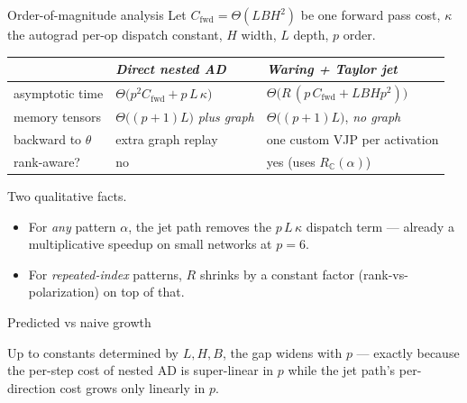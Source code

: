 \documentclass[10pt,aspectratio=169]{beamer}
\newcommand{\C}{\mathbb{C}}
\begin{document}
\begin{frame}{Order-of-magnitude analysis}
  Let $C_{\mathrm{fwd}}\!\!=\!\!\Theta(L B H^2)$ be one forward pass cost,
  $\kappa$ the autograd per-op dispatch constant, $H$ width, $L$ depth, $p$ order.

  \medskip
  \begin{tabular}{lll}
    \toprule
    & \emph{Direct nested AD} & \emph{Waring + Taylor jet} \\
    \midrule
    asymptotic time
    & $\Theta\!\big(p^2 C_{\mathrm{fwd}} + p\, L\, \kappa\big)$
    & $\Theta\!\big(R\,(p\,C_{\mathrm{fwd}} + L B H p^2)\big)$ \\[2pt]
    memory tensors
    & $\Theta\!\big((p{+}1) L\big)$ \emph{plus graph}
    & $\Theta\!\big((p{+}1) L\big)$, \emph{no graph} \\[2pt]
    backward to $\theta$
    & extra graph replay
    & one custom VJP per activation \\[2pt]
    rank-aware?
    & \alert{no}
    & \alert{yes (uses $R_\C(\alpha)$)} \\
    \bottomrule
  \end{tabular}

  \pause
  \medskip
  \alert{Two qualitative facts.}
  \begin{itemize}
    \item For \emph{any} pattern $\alpha$, the jet path removes the
          $p\,L\,\kappa$ dispatch term --- already a multiplicative speedup
          on small networks at $p=6$.
    \item For \emph{repeated-index} patterns, $R$ shrinks by a constant
          factor (rank-vs-polarization) on top of that.
  \end{itemize}
\end{frame}

\begin{frame}{Predicted vs naive growth}
  \begin{center}
  \end{center}

  \medskip
  Up to constants determined by $L,H,B$, the gap widens with $p$ ---
  exactly because the per-step cost of nested AD is super-linear in $p$
  while the jet path's per-direction cost grows only linearly in $p$.
\end{frame}
\end{document}
